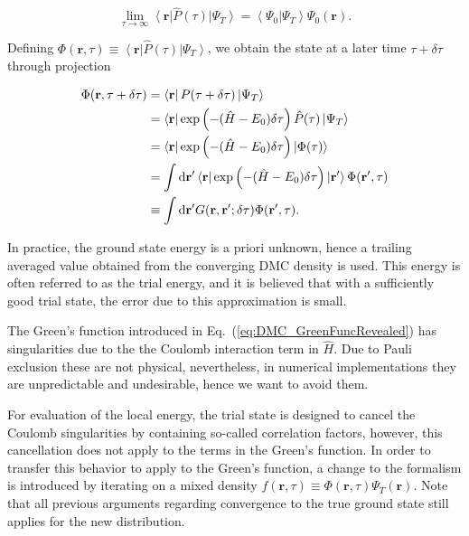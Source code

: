 \documentclass[amsmath, amssymb, aps, floatfix, nofootinbib, preprintnumbers,showpacs, superscriptaddress, twocolumn]{revtex4-1}
\newcommand{\OP}[1]{{\hat{#1}}}
\newcommand{\ket}[1]{\left| #1 \right>}
\newcommand{\bra}[1]{\left< #1 \right|}
\newcommand{\braket}[2]{\left\langle #1 | #2\right\rangle}
\begin{document}
\begin{equation}
 \label{eq:DMC_ExactProjection}
 \lim_{\tau\to\infty} \bra{\mathbf{r}}  \OP{P}(\tau) \ket{\Psi_T} = \braket{\Psi_0}{\Psi_T}\Psi_0(\mathbf{r}).
\end{equation}

Defining $\Phi(\mathbf{r}, \tau) \equiv \bra{\mathbf{r}}\OP{P}(\tau)\ket{\Psi_T}$, we obtain the state at a later time $\tau + \delta\tau$ through projection

\begin{align}
 \Phi(\mathbf{r}, \tau + \delta\tau) &= \bra{\mathbf{r}} P(\tau + \delta\tau) \ket{\Psi_T} \notag\\
 &= \bra{\mathbf{r}} \exp\left({-(\OP{H} - E_0)\delta\tau}\right) \OP{P}(\tau) \ket{\Psi_T} \notag\\
 &= \bra{\mathbf{r}} \exp\left({-(\OP{H} - E_0)\delta\tau}\right) \ket{\Phi(\tau)} \notag\\
 &= \int \mathrm{d}\mathbf{r}' \bra{\mathbf{r}} \exp\left({-(\OP{H} - E_0)\delta\tau}\right)\ket{\mathbf{r}'} \Phi(\mathbf{r}', \tau)\notag \\
 &\equiv \int \mathrm{d}\mathbf{r}' G(\mathbf{r}, \mathbf{r}'; \delta\tau) \Phi(\mathbf{r}', \tau). \label{eq:DMC_GreenFuncRevealed}
\end{align}

In practice, the ground state energy is a priori unknown, hence a trailing averaged value obtained from the converging DMC density is used. This energy is often referred to as the trial energy, and it is believed that with a sufficiently good trial state, the error due to this approximation is small.

The Green's function introduced in Eq.~(\ref{eq:DMC_GreenFuncRevealed}) has singularities due to the the Coulomb interaction term in $\OP{H}$. Due to Pauli exclusion these are not physical, nevertheless, in numerical implementations they are unpredictable and undesirable, hence we want to avoid them.

For evaluation of the local energy, the trial state is designed to cancel the Coulomb singularities by containing so-called correlation factors, however, this cancellation does not apply to the terms in the Green's function. In order to transfer this behavior to apply to the Green's function, a change to the formalism is introduced by iterating on a mixed density $f(\mathbf{r}, \tau) \equiv \Phi(\mathbf{r}, \tau)\Psi_T(\mathbf{r})$. Note that all previous arguments regarding convergence to the true ground state still applies for the new distribution.
\end{document}
